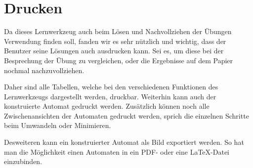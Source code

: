 \section{Drucken}\label{Print}

Da dieses Lernwerkzeug auch beim Lösen und Nachvollziehen der Übungen
Verwendung finden soll, fanden wir es sehr nützlich und wichtig, dass der
Benutzer seine Lösungen auch ausdrucken kann. Sei es, um diese bei der
Besprechung der Übung zu vergleichen, oder die Ergebnisse auf dem Papier
nochmal nachzuvollziehen.\vspace{10pt}

Daher sind alle Tabellen, welche bei den verschiedenen Funktionen des
Lernwerkzeugs dargestellt werden, druckbar. Weiterhin kann auch der konstruierte
Automat gedruckt werden. Zusätzlich können noch alle Zwischenansichten der
Automaten gedruckt werden, sprich die einzelnen Schritte beim Umwandeln oder
Minimieren.\vspace{10pt}

Desweiteren kann ein konstruierter Automat als Bild exportiert werden. So hat
man die Möglichkeit einen Automaten in ein PDF- oder eine \LaTeX -Datei
einzubinden.\vspace{10pt}


